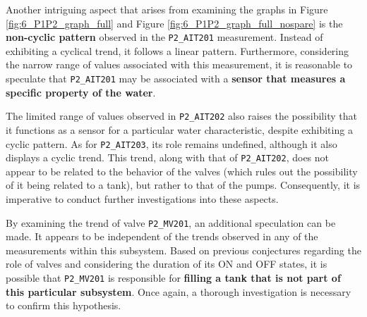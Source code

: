 \bigskip
Another intriguing aspect that arises from examining the graphs in Figure \ref{fig:6_P1P2_graph_full} and Figure \ref{fig:6_P1P2_graph_full_nospare} is the \textbf{non-cyclic pattern} observed in the \texttt{P2\_AIT201} measurement. Instead of exhibiting a cyclical trend, it follows a linear pattern. Furthermore, considering the narrow range of values associated with this measurement, it is reasonable to speculate that \texttt{P2\_AIT201} may be associated with a \textbf{sensor that measures a specific property of the water}.

The limited range of values observed in \texttt{P2\_AIT202} also raises the possibility that it functions as a sensor for a particular water characteristic, despite exhibiting a cyclic pattern. As for \texttt{P2\_AIT203}, its role remains undefined, although it also displays a cyclic trend. This trend, along with that of \texttt{P2\_AIT202}, does not appear to be related to the behavior of the valves (which rules out the possibility of it being related to a tank), but rather to that of the pumps. Consequently, it is imperative to conduct further investigations into these aspects.

\bigskip
By examining the trend of valve \texttt{P2\_MV201}, an additional speculation can be made. It appears to be independent of the trends observed in any of the measurements within this subsystem. Based on previous conjectures regarding the role of valves and considering the duration of its ON and OFF states, it is possible that \texttt{P2\_MV201} is responsible for \textbf{filling a tank that is not part of this particular subsystem}. Once again, a thorough investigation is necessary to confirm this hypothesis.


